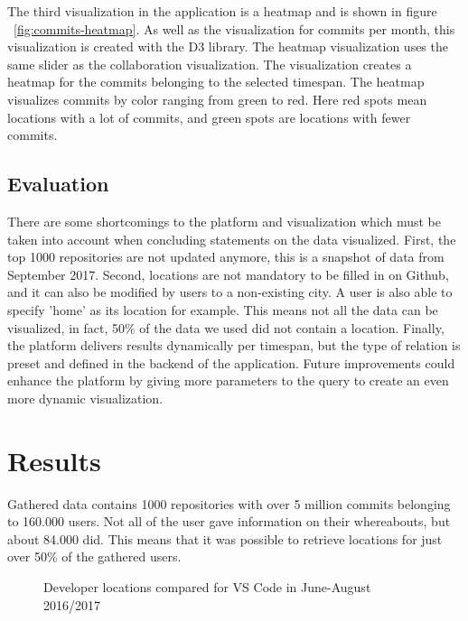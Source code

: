 \documentclass[acmtog, authorversion]{acmart}
\begin{document}
The third visualization in the application is a heatmap and is shown in figure ~\ref{fig:commits-heatmap}.
As well as the visualization for commits per month, this visualization is created with the D3 library.
The heatmap visualization uses the same slider as the collaboration visualization.
The visualization creates a heatmap for the commits belonging to the selected timespan.
The heatmap visualizes commits by color ranging from green to red.
Here red spots mean locations with a lot of commits, and green spots are locations with fewer commits.

\subsection{Evaluation}
There are some shortcomings to the platform and visualization which must be taken into account when concluding statements on the data visualized. 
First, the top 1000 repositories are not updated anymore, this is a snapshot of data from September 2017. 
Second, locations are not mandatory to be filled in on Github, and it can also be modified by users to a non-existing city. A user is also able to specify 'home' as its location for example.
This means not all the data can be visualized, in fact, 50\% of the data we used did not contain a location.
Finally, the platform delivers results dynamically per timespan, but the type of relation is preset and defined in the backend of the application. 
Future improvements could enhance the platform by giving more parameters to the query to create an even more dynamic visualization.

\FloatBarrier
\section{Results}
Gathered data contains 1000 repositories with over 5 million commits belonging to 160.000 users.
Not all of the user gave information on their whereabouts, but about 84.000 did.
This means that it was possible to retrieve locations for just over 50\% of the gathered users.

\begin{figure}
\caption{Developer locations compared for VS Code in June-August 2016/2017}
\label{fig:vscode-developer-locations}
\end{figure}
\end{document}
